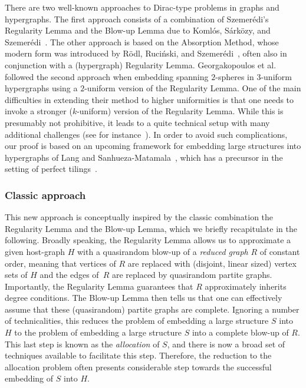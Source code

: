 \documentclass[12pt,reqno]{amsart}
\theoremstyle{plain}
\theoremstyle{definition}
\numberwithin{equation}{section}
\begin{document}
	There are two well-known approaches to Dirac-type problems in graphs and hypergraphs.
	The first approach consists of a combination of Szemer\'{e}di's Regularity Lemma and the Blow-up Lemma due to Koml\'{o}s, S\'{a}rk\"{o}zy, and Szemer\'{e}di~\cite{KSS98}.
	The other approach is based on the Absorption Method, whose modern form was introduced by R\"{o}dl, Ruci\'{n}ski, and Szemer\'{e}di~\cite{RRS08a}, often also in conjunction with a (hypergraph) Regularity Lemma.
	Georgakopoulos et al.~\cite{georgakopoulos2022spanning} followed the second approach when embedding spanning $2$-spheres in $3$-uniform hypergraphs using a $2$-uniform version of the Regularity Lemma.
	One of the main difficulties in extending their method to higher uniformities is that one needs to invoke a stronger ($k$-uniform) version of the Regularity Lemma.
	While this is presumably not prohibitive, it leads to a quite technical setup with many additional challenges (see for instance~\cite{LS22}).
	In order to avoid such complications, our proof is based on an upcoming framework for embedding large structures into hypergraphs of Lang and Sanhueza-Matamala~\cite{LS24}, which has a precursor in the setting of perfect tilings~\cite{lang2023tiling}.
	
	\subsubsection*{Classic approach}
	This new approach is conceptually inspired by the classic combination the Regularity Lemma and the Blow-up Lemma, which we briefly recapitulate in the following.
	Broadly speaking, the Regularity Lemma allows us to approximate a given host-graph $H$ with a quasirandom blow-up of a \emph{reduced graph} $R$ of constant order, meaning that vertices of $R$ are replaced with (disjoint, linear sized) vertex sets of $H$ and the edges of~$R$ are replaced by quasirandom partite graphs.
	Importantly, the Regularity Lemma guarantees that $R$ approximately inherits degree conditions.
	The Blow-up Lemma then tells us that one can effectively assume that these (quasirandom) partite graphs are complete.
	Ignoring a number of technicalities, this reduces the problem of embedding a large structure $S$ into $H$ to the problem of embedding a large structure $S$ into a complete blow-up of $R$.
	This last step is known as the \emph{allocation} of $S$, and there is now a broad set of techniques available to facilitate this step. Therefore, the reduction to the allocation problem often presents considerable step towards the successful embedding of $S$ into $H$.
	
\end{document}
